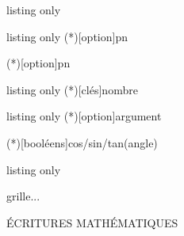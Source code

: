 \documentclass[a4paper,french,11pt]{article}
\begin{document}
\begin{PresCodeTexPL}{listing only}
\end{PresCodeTexPL}

\begin{PresCodeTexPL}{listing only}
\Arrangement(*)[option]{p}{n}

\Combinaison(*)[option]{p}{n}
\end{PresCodeTexPL}

\begin{PresCodeTexPL}{listing only}
\ConversionDecBin(*)[clés]{nombre}


\end{PresCodeTexPL}

\begin{PresCodeTexPL}{listing only}
\ConversionFraction(*)[option]{argument}



\LigneTrigo(*)[booléens]{cos/sin/tan}(angle)
\end{PresCodeTexPL}

\begin{PresCodeTexPL}{listing only}
\begin{EnvSudoMaths}[options]{grille}...\end{EnvSudoMaths}
\end{PresCodeTexPL}

\newpage

\phantom{t}\par\vfill\par
\begin{PART}
	\begin{center}
		\Huge\MakeUppercase{Écritures mathématiques}
	\end{center}
\end{PART}
\par\vfill\par\phantom{t}
\end{document}
